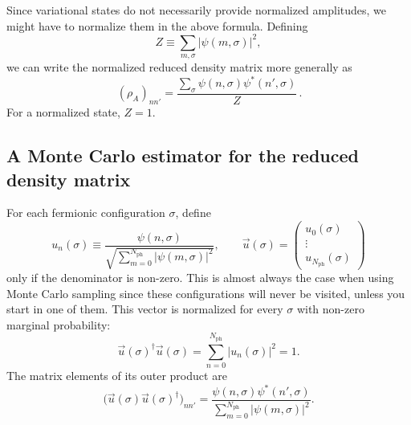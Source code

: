 \documentclass[../../main.tex]{subfiles}
\begin{document}
Since variational states do not necessarily provide normalized amplitudes, we might have to normalize them in the above formula. Defining
\begin{equation}
Z\equiv\sum_{m,\sigma}|\psi(m,\sigma)|^2,
\end{equation}
we can write the normalized reduced density matrix more generally as
\begin{equation}
\boxed{\,
(\rho_A)_{nn'}
=\frac{\sum_\sigma\psi(n,\sigma)\psi^*(n',\sigma)}{Z}
\,}.
\end{equation}
For a normalized state, $Z=1$.

\subsection{A Monte Carlo estimator for the reduced density matrix}

For each fermionic configuration $\sigma$, define
\begin{equation}
u_n(\sigma)\equiv
\frac{\psi(n,\sigma)}
{\sqrt{\sum_{m=0}^{N_{\mathrm{ph}}}|\psi(m,\sigma)|^2}},
\qquad
\vec u(\sigma)=
\begin{pmatrix}
u_0(\sigma)\\
\vdots\\
u_{N_{\mathrm{ph}}}(\sigma)
\end{pmatrix}
\end{equation}
only if the denominator is non-zero. This is almost always the case when using Monte Carlo sampling since these configurations will never be visited, unless you start in one of them.
This vector is normalized for every $\sigma$ with non-zero marginal
probability:
\begin{equation}
\vec u(\sigma)^\dagger\vec u(\sigma)
=\sum_{n=0}^{N_{\mathrm{ph}}}|u_n(\sigma)|^2=1.
\end{equation}
The matrix elements of its outer product are
\begin{equation}
\bigl(\vec u(\sigma)\vec u(\sigma)^\dagger\bigr)_{nn'}
=
\frac{\psi(n,\sigma)\psi^*(n',\sigma)}
{\sum_{m=0}^{N_{\mathrm{ph}}}|\psi(m,\sigma)|^2}.
\end{equation}
\end{document}
